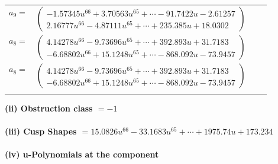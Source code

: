 \documentclass[1p]{elsarticle_modified}
\theoremstyle{definition}
\begin{document}
\begin{tabular}{m{7pt} m{180pt} m{7pt} m{180pt} }
\flushright $a_{9}=$&$\begin{pmatrix}-1.57345 u^{66}+3.70563 u^{65}+\cdots-91.7422 u-2.61257\\2.16777 u^{66}-4.87111 u^{65}+\cdots+235.385 u+18.0302\end{pmatrix}$ \\
\flushright $a_{8}=$&$\begin{pmatrix}4.14278 u^{66}-9.73696 u^{65}+\cdots+392.893 u+31.7183\\-6.68802 u^{66}+15.1248 u^{65}+\cdots-868.092 u-73.9457\end{pmatrix}$\\ \flushright $a_{8}=$&$\begin{pmatrix}4.14278 u^{66}-9.73696 u^{65}+\cdots+392.893 u+31.7183\\-6.68802 u^{66}+15.1248 u^{65}+\cdots-868.092 u-73.9457\end{pmatrix}$\\&\end{tabular}
\flushleft \textbf{(ii) Obstruction class $= -1$}\\~\\
\flushleft \textbf{(iii) Cusp Shapes $= 15.0826 u^{66}-33.1683 u^{65}+\cdots+1975.74 u+173.234$}\\~\\
\newpage\renewcommand{\arraystretch}{1}
\flushleft \textbf{(iv) u-Polynomials at the component}\newline \\
\end{document}
